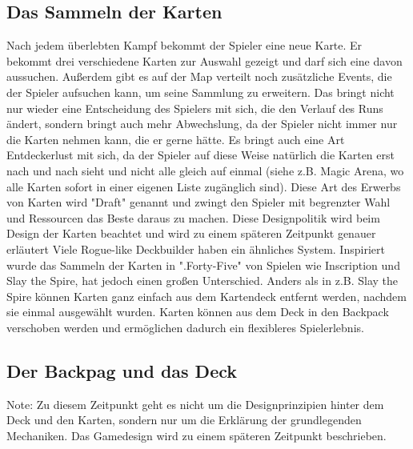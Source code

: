 \subsection{Das Sammeln der Karten}\label{sammeln_der_Karten}

Nach jedem überlebten Kampf bekommt der Spieler eine neue Karte. Er bekommt drei verschiedene Karten zur Auswahl gezeigt und darf sich eine davon aussuchen.
Außerdem gibt es auf der Map verteilt noch zusätzliche Events, die der Spieler aufsuchen kann, um seine Sammlung zu erweitern.
Das bringt nicht nur wieder eine Entscheidung des Spielers mit sich, die den Verlauf des Runs ändert, sondern bringt auch mehr Abwechslung,
da der Spieler nicht immer nur die Karten nehmen kann, die er gerne hätte. Es bringt auch eine Art Entdeckerlust mit sich, da der Spieler
auf diese Weise natürlich die Karten erst nach und nach sieht und nicht alle gleich auf einmal (siehe z.B. Magic Arena, wo alle Karten sofort in einer eigenen Liste zugänglich sind). %
Diese Art des Erwerbs von Karten wird "Draft" genannt %
und zwingt den Spieler mit begrenzter Wahl und Ressourcen das Beste daraus zu machen. Diese Designpolitik wird beim Design der Karten beachtet und wird zu einem späteren Zeitpunkt genauer erläutert %
Viele Rogue-like Deckbuilder haben ein ähnliches System. Inspiriert wurde das Sammeln der Karten in ".Forty-Five" von Spielen wie Inscription und Slay the Spire, %
hat jedoch einen großen Unterschied. Anders als in z.B. Slay the Spire können Karten ganz einfach aus dem Kartendeck entfernt werden, nachdem sie einmal ausgewählt wurden.
Karten können aus dem Deck in den Backpack verschoben werden und ermöglichen dadurch ein flexibleres Spielerlebnis. %


\subsection{Der Backpag und das Deck}\label{backpack_and_deck}
Note: Zu diesem Zeitpunkt geht es nicht um die Designprinzipien hinter dem Deck und den Karten,
sondern nur um die Erklärung der grundlegenden Mechaniken. Das Gamedesign wird zu einem späteren Zeitpunkt beschrieben.

